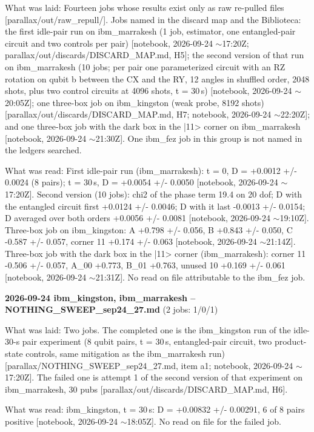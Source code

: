 \documentclass[11pt]{article}
\begin{document}
What was laid: Fourteen jobs whose results exist only as raw re-pulled files {[}parallax/out/raw\_repull/{]}. Jobs named in the discard map and the Biblioteca: the first idle-pair run on ibm\_marrakesh (1 job, estimator, one entangled-pair circuit and two controls per pair) {[}notebook, 2026-09-24 \(\sim\)17:20Z; parallax/out/discards/DISCARD\_MAP.md, H5{]}; the second version of that run on ibm\_marrakesh (10 jobs; per pair one parameterized circuit with an RZ rotation on qubit b between the CX and the RY, 12 angles in shuffled order, 2048 shots, plus two control circuits at 4096 shots, t = 30\,\textmu s) {[}notebook, 2026-09-24 \(\sim\)20:05Z{]}; one three-box job on ibm\_kingston (weak probe, 8192 shots) {[}parallax/out/discards/DISCARD\_MAP.md, H7; notebook, 2026-09-24 \(\sim\)22:20Z{]}; and one three-box job with the dark box in the |11\textgreater{} corner on ibm\_marrakesh {[}notebook, 2026-09-24 \(\sim\)21:30Z{]}. One ibm\_fez job in this group is not named in the ledgers searched.

What was read: First idle-pair run (ibm\_marrakesh): t = 0, D = +0.0012 +/- 0.0024 (8 pairs); t = 30\,\textmu s, D = +0.0054 +/- 0.0050 {[}notebook, 2026-09-24 \(\sim\)17:20Z{]}. Second version (10 jobs): chi2 of the phase term 19.4 on 20 dof; D with the entangled circuit first +0.0124 +/- 0.0046; D with it last -0.0013 +/- 0.0154; D averaged over both orders +0.0056 +/- 0.0081 {[}notebook, 2026-09-24 \(\sim\)19:10Z{]}. Three-box job on ibm\_kingston: A +0.798 +/- 0.056, B +0.843 +/- 0.050, C -0.587 +/- 0.057, corner 11 +0.174 +/- 0.063 {[}notebook, 2026-09-24 \(\sim\)21:14Z{]}. Three-box job with the dark box in the |11\textgreater{} corner (ibm\_marrakesh): corner 11 -0.506 +/- 0.057, A\_00 +0.773, B\_01 +0.763, unused 10 +0.169 +/- 0.061 {[}notebook, 2026-09-24 \(\sim\)21:31Z{]}. No read on file attributable to the ibm\_fez job.

\textbf{2026-09-24 ibm\_kingston, ibm\_marrakesh -- NOTHING\_SWEEP\_sep24\_27.md} (2 jobs: 1/0/1)

What was laid: Two jobs. The completed one is the ibm\_kingston run of the idle-30-\textmu s pair experiment (8 qubit pairs, t = 30\,\textmu s, entangled-pair circuit, two product-state controls, same mitigation as the ibm\_marrakesh run) {[}parallax/NOTHING\_SWEEP\_sep24\_27.md, item a1; notebook, 2026-09-24 \(\sim\)17:20Z{]}. The failed one is attempt 1 of the second version of that experiment on ibm\_marrakesh, 30 pubs {[}parallax/out/discards/DISCARD\_MAP.md, H6{]}.

What was read: ibm\_kingston, t = 30\,\textmu s: D = +0.00832 +/- 0.00291, 6 of 8 pairs positive {[}notebook, 2026-09-24 \(\sim\)18:05Z{]}. No read on file for the failed job.
\end{document}
